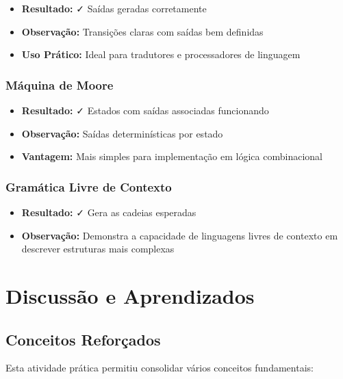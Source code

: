 \documentclass[12pt,a4paper]{article}
\begin{document}
\begin{itemize}
    \item \textbf{Resultado:} ✓ Saídas geradas corretamente
    \item \textbf{Observação:} Transições claras com saídas bem definidas
    \item \textbf{Uso Prático:} Ideal para tradutores e processadores de linguagem
\end{itemize}

\subsubsection{Máquina de Moore}

\begin{itemize}
    \item \textbf{Resultado:} ✓ Estados com saídas associadas funcionando
    \item \textbf{Observação:} Saídas determinísticas por estado
    \item \textbf{Vantagem:} Mais simples para implementação em lógica combinacional
\end{itemize}

\subsubsection{Gramática Livre de Contexto}

\begin{itemize}
    \item \textbf{Resultado:} ✓ Gera as cadeias esperadas
    \item \textbf{Observação:} Demonstra a capacidade de linguagens livres de contexto em descrever estruturas mais complexas
\end{itemize}

\newpage

\section{Discussão e Aprendizados}

\subsection{Conceitos Reforçados}

Esta atividade prática permitiu consolidar vários conceitos fundamentais:
\end{document}
